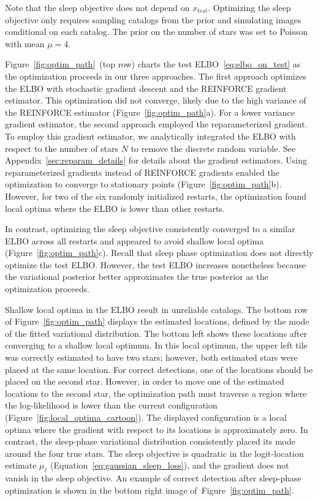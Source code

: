Note that the sleep objective does not depend on $x_{test}$. 
Optimizing the sleep objective only requires sampling catalogs from the prior
and simulating images conditional on each catalog. 
The prior on the number of stars was set to Poisson with mean $\mu = 4$. 

Figure~\ref{fig:optim_path}~(top row) charts the test ELBO~\eqref{eq:elbo_on_test} as the optimization proceeds in our three approaches.
The first approach optimizes the ELBO with stochastic gradient descent and the REINFORCE gradient estimator.
This optimization did not converge, likely due to the high variance of the REINFORCE estimator (Figure~\ref{fig:optim_path}a). 
For a lower variance gradient estimator, the second approach employed the reparameterized gradient. To employ this gradient estimator, we analytically integrated the ELBO with respect to the number of stars $N$ to remove the discrete random variable. 
See Appendix~\ref{sec:reparam_details} for details about the gradient estimators. 
Using reparameterized gradients instead of REINFORCE gradients enabled the optimization to converge to stationary points (Figure~\ref{fig:optim_path}b). 
However, for two of the six randomly initialized restarts, 
the optimization found local optima where the ELBO is lower than other restarts. 

In contrast, optimizing the sleep objective consistently converged to a similar ELBO across all restarts and appeared to avoid shallow local optima (Figure~\ref{fig:optim_path}c).
Recall that sleep phase optimization does not directly optimize the test ELBO. However, the test ELBO increases nonetheless because the variational posterior better approximates the true posterior as the optimization proceeds. 

Shallow local optima in the ELBO result in unreliable catalogs. 
The bottom row of Figure~\ref{fig:optim_path} displays the estimated locations, defined by the mode of the fitted variational distribution. 
The bottom left shows these locations after converging to a shallow local optimum. 
In this local optimum, the upper left tile was correctly estimated to have two stars; however, both estimated stars were placed at the same location.
For correct detections, one of the locations should be placed on the second star.
However, in order to move one of the estimated locations to the second star, the optimization path must traverse a region where the log-likelihood is lower than the current configuration (Figure~\ref{fig:local_optima_cartoon}). 
The displayed configuration is a local optima where the gradient with respect to its locations is approximately zero.
In contrast, the sleep-phase variational distribution consistently placed its mode around the four true stars. 
The sleep objective is quadratic in the logit-location estimate $\mu_\ell$ (Equation~\ref{eq:gaussian_sleep_loss}), and the gradient does not vanish in the sleep objective. 
An example of correct detection after sleep-phase optimization is shown in the bottom right image of~Figure~\ref{fig:optim_path}.

